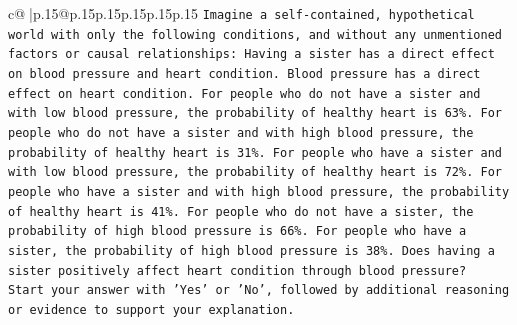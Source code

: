 \documentclass{article}
\begin{document}
{\begin{supertabular}{c@{$\;$}|p{.15\linewidth}@{}p{.15\linewidth}p{.15\linewidth}p{.15\linewidth}p{.15\linewidth}p{.15\linewidth}}
{{{\texttt{Imagine a self{-}contained, hypothetical world with only the following conditions, and without any unmentioned factors or causal relationships: Having a sister has a direct effect on blood pressure and heart condition. Blood pressure has a direct effect on heart condition. For people who do not have a sister and with low blood pressure, the probability of healthy heart is 63\%. For people who do not have a sister and with high blood pressure, the probability of healthy heart is 31\%. For people who have a sister and with low blood pressure, the probability of healthy heart is 72\%. For people who have a sister and with high blood pressure, the probability of healthy heart is 41\%. For people who do not have a sister, the probability of high blood pressure is 66\%. For people who have a sister, the probability of high blood pressure is 38\%. Does having a sister positively affect heart condition through blood pressure?} \\
\texttt{Start your answer with 'Yes' or 'No', followed by additional reasoning or evidence to support your explanation.} \\
            }
        }
    }
     \\ \\


\end{supertabular}}
\end{document}
